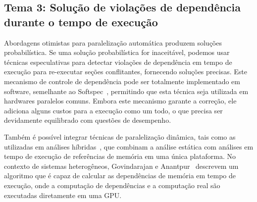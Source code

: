 \documentclass[a4paper,12pt]{article}
\begin{document}
\subsection{Tema 3: Solução de violações de dependência durante o tempo de execução}


Abordagens otimistas para paralelização automática produzem soluções probabilística. Se uma solução probabilística for inaceitável, podemos usar técnicas especulativas para detectar violações de dependência em tempo de execução para re-executar seções conflitantes, fornecendo soluções precisas. Este mecanismo de controle de dependência pode ser totalmente implementado em software, semelhante ao Softspec~\cite{bruening98}, permitindo que esta técnica seja utilizada em hardwares paralelos comuns. Embora este mecanismo garante a correção, ele adiciona alguns custos para a execução como um todo, o que precisa ser devidamente equilibrado com questões de desempenho.


Também é possível integrar técnicas de paralelização dinâmica, tais como as utilizadas em análises híbridas~\cite{rus03}, que combinam a análise estática com análises em tempo de execução de referências de memória em uma única plataforma. No contexto de sistemas heterogêneos, Govindarajan e Anantpur~\cite{govindarajan13} descrevem um algoritmo que é capaz de calcular as dependências de memória em tempo de execução, onde a computação de dependências e a computação real são executadas diretamente em uma GPU.

\end{document}
